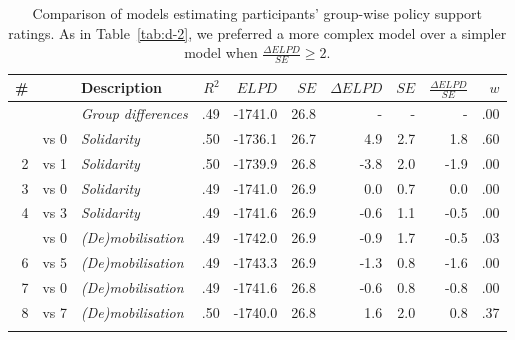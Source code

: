 \documentclass[12pt, a4paper]{article}
\begin{document}
\begin{table}
\centering
{}
\caption{Comparison of models estimating participants' group-wise policy support ratings. As in Table~\ref{tab:d-2}, we preferred a more complex model over a simpler model when $\frac{\Delta\textit{ELPD}}{\textit{SE}} \geq 2$.}
\small	
\begin{tabularx}{\linewidth}{r@{~}rXrrrrrrr} \toprule
\# &  &  Description & $R^2$ & $\textit{ELPD}$ & $\textit{SE}$ & $\Delta\textit{ELPD}$ & $\textit{SE}$ & $\frac{\Delta\textit{ELPD}}{\textit{SE}}$ & $w$ \\ \midrule \addlinespace
0 &      & \textit{Group differences} & .49 & -1741.0 & 26.8 & - & - & - & .00 \\ \addlinespace
1 & vs 0 & \textit{Solidarity}       & .50 & -1736.1 & 26.7 &  4.9 & 2.7 & 1.8 & .60 \\
2 & vs 1 & \textit{Solidarity}       & .50 & -1739.9 & 26.8 &   -3.8 & 2.0 & -1.9 & .00 \\
3 & vs 0 & \textit{Solidarity}       & .49 & -1741.0 & 26.9 & 0.0 & 0.7 & 0.0 & .00 \\
4 & vs 3 & \textit{Solidarity}       & .49 & -1741.6 & 26.9 &  -0.6 & 1.1 & -0.5 & .00 \\ \addlinespace
5 & vs 0 & \textit{(De)mobilisation} & .49 & -1742.0 & 26.9 & -0.9 & 1.7 & -0.5 & .03 \\
6 & vs 5 & \textit{(De)mobilisation} & .49 & -1743.3 & 26.9 & -1.3 & 0.8 & -1.6 & .00\\
7 & vs 0 & \textit{(De)mobilisation} & .49 & -1741.6 & 26.8 & -0.6 & 0.8 & -0.8 & .00\\
8 & vs 7 & \textit{(De)mobilisation} & .50 & -1740.0 & 26.8 &  1.6 & 2.0 & 0.8 & .37 \\ \addlinespace \bottomrule
\end{tabularx}
\label{tab:d-3}
\end{table}
\end{document}
